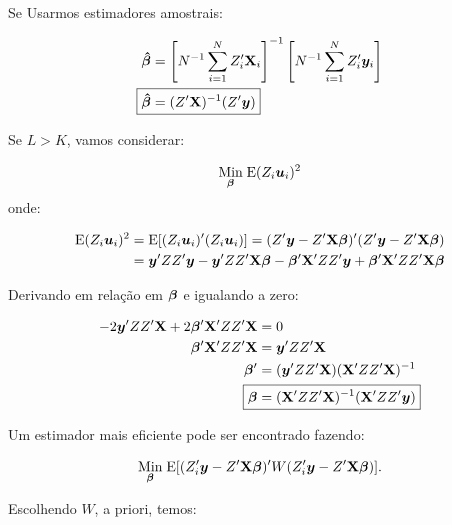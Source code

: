 \documentclass[11pt, oneside, a4paper, article]{article}
\numberwithin{equation}{section}
\begin{document}
\begin{description}
Se Usarmos estimadores amostrais:

\vspace{-1 em}
\begin{align*}
\mbs{\hat{\beta}} &=
\left[ N^{-1} \sum_{i=1}^{N} Z_{i}^{\prime} \Xmat_{i} \right]^{-1}
\left[ N^{-1} \sum_{i=1}^{N} Z_{i}^{\prime} \yvec_{i} \right]
\\
\Aboxed{
\mbs{\hat{\beta}} &=
( Z^{\prime} \Xmat )^{-1} ( Z^{\prime} \yvec ) }
\end{align*}

\vspace{1 em}
Se $L > K$, vamos considerar:

\vspace{-1 em}
\begin{align*}
\underset{\boldsymbol{\beta}}{\text{Min}} \;
\text{E}( Z_{i}\boldsymbol{u}_{i} )^2
\end{align*}
\noindent onde:

\vspace{-1 em}
\begin{align*}
\text{E}( Z_{i}\boldsymbol{u}_{i} )^2 
&=
\text{E}[ ( Z_{i}\boldsymbol{u}_{i} )' ( Z_{i}\boldsymbol{u}_{i} ) ]
=
( Z' \boldsymbol{y} - Z' \mathbf{X} \boldsymbol{\beta} )' ( Z' \boldsymbol{y} - Z' \mathbf{X} \boldsymbol{\beta} )
\\
&=
\boldsymbol{y}' ZZ' \boldsymbol{y}
-
\boldsymbol{y}' ZZ' \mathbf{X} \boldsymbol{\beta}
-
\boldsymbol{\beta}' \mathbf{X}' ZZ' \boldsymbol{y}
+
\boldsymbol{\beta}' \mathbf{X}' ZZ' \mathbf{X} \boldsymbol{\beta}
\end{align*}

Derivando em relação em $\boldsymbol{\beta}$ e igualando a zero:

\vspace{-1 em}
\begin{align*}
-2 \yvec' ZZ' \Xmat + 2 \betavec'\Xmat' ZZ' \Xmat &= 0
\\
\betavec'\Xmat' ZZ' \Xmat &= \yvec' ZZ' \Xmat 
\\
\betavec' &= ( \yvec' ZZ' \Xmat ) ( \Xmat' ZZ' \Xmat )^{-1}
\\
\Aboxed{
\betavec &= ( \Xmat' ZZ' \Xmat )^{-1} ( \Xmat' ZZ' \yvec ) }
\end{align*}

Um estimador mais eficiente pode ser encontrado fazendo:

\vspace{-1 em}
\begin{align*}
\underset{\boldsymbol{\beta}}{\text{Min}} \;
\text{E}[ ( Z_{i}' \boldsymbol{y} - Z' \mathbf{X} \boldsymbol{\beta} )' W ( Z_{i}' \boldsymbol{y} - Z' \mathbf{X} \boldsymbol{\beta} ) ].
\end{align*}

\noindent
Escolhendo $\widehat{W}$, a priori, temos:


\end{description}
\end{document}

